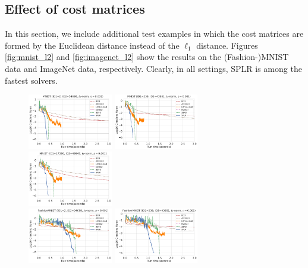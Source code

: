 \documentclass{article}
\theoremstyle{plain}
\theoremstyle{definition}
\theoremstyle{remark}
\begin{document}
\subsection{Effect of cost matrices}
\label{appendix:extra-cost}
In this section, we include additional test examples in which the cost matrices are formed by the Euclidean distance instead of the $\ell_1$ distance. Figures \ref{fig:mnist_l2} and \ref{fig:imagenet_l2} show the results on the (Fashion-)MNIST data and ImageNet data, respectively.
Clearly, in all settings, SPLR is among the fastest solvers.

\begin{figure}[h]
    \centering
    \includegraphics[width=0.33\textwidth]{save/MNIST - Extra/run_times/ID1=2, ID2=54698, norm=l2, reg=0.001}
    \includegraphics[width=0.33\textwidth]{save/MNIST - Extra/run_times/ID1=239, ID2=43981, norm=l2, reg=0.001}
    \includegraphics[width=0.33\textwidth]{save/MNIST - Extra/run_times/ID1=17390, ID2=49947, norm=l2, reg=0.001}\\
    \includegraphics[width=0.33\textwidth]{save/FashionMNIST - Extra/run_times/ID1=2, ID2=54698, norm=l2, reg=0.001}
    \includegraphics[width=0.33\textwidth]{save/FashionMNIST - Extra/run_times/ID1=239, ID2=43981, norm=l2, reg=0.001}

\end{figure}
\end{document}
